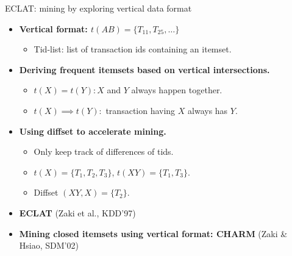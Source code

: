 \documentclass[aspectratio=169,t,xcolor=dvipsnames]{beamer}
\begin{document}
  {
    \begin{frame}{ECLAT: mining by exploring vertical data format}
        \begin{itemize}
            \item \textbf{Vertical format: $t(AB) = \{T_{11},T_{25},\ldots\}$}
            \begin{itemize}
              \item Tid-list: list of transaction ids containing an itemset.
            \end{itemize}
            \item \textbf{Deriving frequent itemsets based on vertical intersections.}
            \begin{itemize}
              \item $t(X) = t(Y): X$ and $Y$ always happen together.
              \item $t(X) \implies t(Y):$ transaction having $X$ always has $Y$.
            \end{itemize}
            \item \textbf{Using diffset to accelerate mining.}
            \begin{itemize}
              \item Only keep track of differences of tids.
              \item $t(X) = \{T_1,T_2,T_3\}$, $t(XY) = \{T_1,T_3\}$.
              \item Diffset $(XY,X) = \{T_2\}$.
            \end{itemize}
            \item \textbf{ECLAT} (Zaki et al., KDD'97)
            \item \textbf{Mining closed itemsets using vertical format: CHARM} (Zaki \& Hsiao, SDM'02)
        \end{itemize}
    \end{frame}
  }
\end{document}
